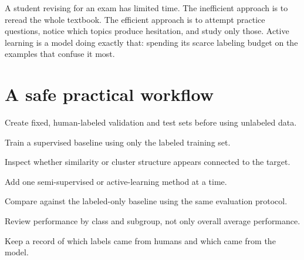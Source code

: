\begin{mlfigure}
\end{mlfigure}

\begin{analogy}
A student revising for an exam has limited time. The inefficient approach is to reread the whole textbook. The efficient approach is to attempt practice questions, notice which topics produce hesitation, and study only those. Active learning is a model doing exactly that: spending its scarce labeling budget on the examples that confuse it most.
\end{analogy}

\section{A safe practical workflow}

\begin{mlsteps}
  \item Create fixed, human-labeled validation and test sets before using unlabeled data.
  \item Train a supervised baseline using only the labeled training set.
  \item Inspect whether similarity or cluster structure appears connected to the target.
  \item Add one semi-supervised or active-learning method at a time.
  \item Compare against the labeled-only baseline using the same evaluation protocol.
  \item Review performance by class and subgroup, not only overall average performance.
  \item Keep a record of which labels came from humans and which came from the model.
\end{mlsteps}

